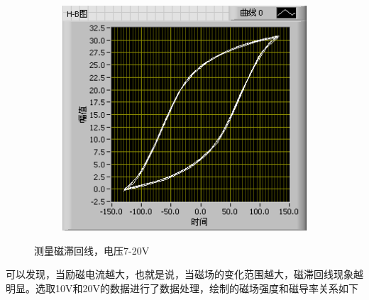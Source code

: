 \documentclass{ctexart}
\begin{document}
\begin{figure}[H]
\begin{subfigure}{0.32\linewidth}
  \end{subfigure}
  \begin{subfigure}{0.16\linewidth}
    \phantom{}
  \end{subfigure}
  \begin{subfigure}{0.32\linewidth}
    \includegraphics[width=\linewidth]{LabVIEW使用基础/铁材料的磁滞现象和磁滞回线/20V.png}
  \end{subfigure}
  \caption{测量磁滞回线，电压7-20V}
\end{figure}

可以发现，当励磁电流越大，也就是说，当磁场的变化范围越大，磁滞回线现象越明显。选取10V和20V的数据进行了数据处理，绘制的磁场强度和磁导率关系如下
\end{document}
